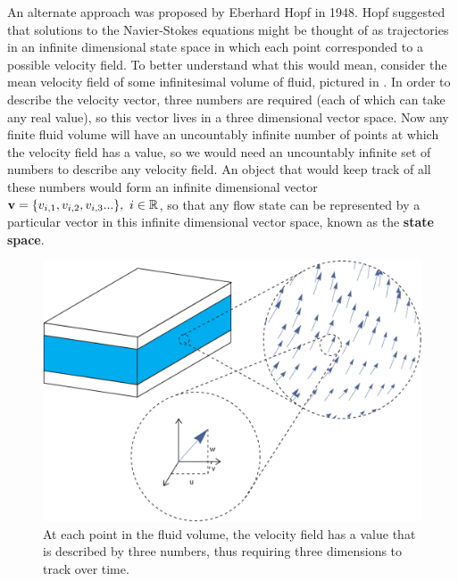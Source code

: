An alternate approach was proposed by Eberhard Hopf in 1948. Hopf suggested that solutions to the Navier-Stokes equations might be thought of as trajectories in an infinite dimensional state space in which each point corresponded to a possible velocity field. To better understand what this would mean, consider the mean velocity field of some infinitesimal volume of fluid, pictured in . In order to describe the velocity vector, three numbers are required (each of which can take any real value), so this vector lives in a three dimensional vector space. Now any finite fluid volume will have an uncountably infinite number of points at which the velocity field has a value, so we would need an uncountably infinite set of numbers to describe any velocity field. An object that would keep track of all these numbers would form an infinite dimensional vector $\mathbf{v} = \{v_{i,1},v_{i,2},v_{i,3}...\},~i \in \mathbb{R}$, so that any flow state can be represented by a particular vector in this infinite dimensional vector space, known as the {\bf state space}. 
\begin{figure}
\centerline{
\includegraphics[scale=0.6]{Figs/VectorSpace}}
\caption{At each point in the fluid volume, the velocity field has a value that is described by three numbers, thus requiring three dimensions to track over time.}\label{fig:VectorSpace}
\end{figure}

